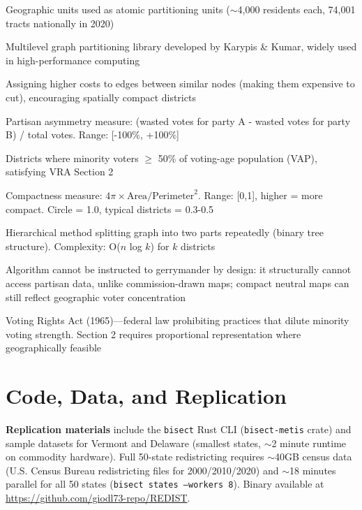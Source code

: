 \documentclass[11pt]{article}
\begin{document}
\begin{description}[leftmargin=2.5cm,style=nextline,noitemsep,topsep=4pt]
    \item[Census tracts] Geographic units used as atomic partitioning units ($\sim$4,000 residents each, 74,001 tracts nationally in 2020)
    \item[METIS] Multilevel graph partitioning library developed by Karypis \& Kumar, widely used in high-performance computing
    \item[Edge-weighted partitioning] Assigning higher costs to edges between similar nodes (making them expensive to cut), encouraging spatially compact districts
    \item[Efficiency gap (EG)] Partisan asymmetry measure: (wasted votes for party A - wasted votes for party B) / total votes. Range: [-100\%, +100\%]
    \item[Majority-minority (MM) districts] Districts where minority voters $\geq$ 50\% of voting-age population (VAP), satisfying VRA Section 2
    \item[Polsby-Popper (PP)] Compactness measure: $4\pi \times \text{Area} / \text{Perimeter}^2$. Range: [0,1], higher = more compact. Circle = 1.0, typical districts = 0.3-0.5
    \item[Recursive bisection] Hierarchical method splitting graph into two parts repeatedly (binary tree structure). Complexity: O($n$ log $k$) for $k$ districts
    \item[Impossibility defense] Algorithm cannot be instructed to gerrymander by design: it structurally cannot access partisan data, unlike commission-drawn maps; compact neutral maps can still reflect geographic voter concentration
    \item[VRA] Voting Rights Act (1965)---federal law prohibiting practices that dilute minority voting strength. Section 2 requires proportional representation where geographically feasible
\end{description}

\section*{Code, Data, and Replication}

\textbf{Replication materials} include the \texttt{bisect} Rust CLI (\texttt{bisect-metis} crate) and sample datasets for Vermont and Delaware (smallest states, $\sim$2 minute runtime on commodity hardware). Full 50-state redistricting requires $\sim$40GB census data (U.S. Census Bureau redistricting files for 2000/2010/2020) and $\sim$18 minutes parallel for all 50 states (\texttt{bisect states --workers 8}). Binary available at \url{https://github.com/giodl73-repo/REDIST}.
\end{document}
